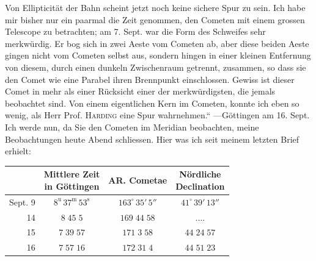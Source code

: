 \par\indent Von Ellipticität der Bahn scheint jetzt noch keine sichere Spur zu sein. Ich habe mir bisher nur ein paarmal die Zeit genommen, den Cometen mit einem grossen Telescope zu betrachten; am 7. Sept. war die Form des Schweifes sehr merkwürdig. Er bog sich in zwei Aeste vom Cometen ab, aber diese beiden Aeste gingen nicht vom Cometen selbst aus, sondern hingen in einer kleinen Entfernung von diesem, durch einen dunkeln Zwischenraum getrennt, zusammen, so dass sie den Comet wie eine Parabel ihren Brennpunkt einschlossen. Gewiss ist dieser Comet in mehr als einer Rücksicht einer der merkwürdigsten, die jemals beobachtet sind. Von einem eigentlichen Kern im Cometen, konnte ich eben so wenig, als Herr Prof. \textsc{Harding} eine Spur wahrnehmen.“ ---\quad Göttingen am 16. Sept. Ich werde nun, da Sie den Cometen im Meridian beobachten, meine Beobachtungen heute Abend schliessen. Hier was ich seit meinem letzten Brief erhielt:
\begin{center}\fontsize{10}{12}\selectfont\setlength{\tabcolsep}{4pt}\renewcommand{\arraystretch}{1.15}\begin{tabular}{r|c|c|c}
 & \shortstack{Mittlere Zeit\\in Göttingen} & AR. Cometae & \shortstack{Nördliche\\Declination}\\\hline
Sept. 9 & $8^{\mathrm u}\,37^{\mathrm m}\,53^{\mathrm s}$ & $163^\circ\,35'\,5''$ & $41^\circ\,39'\,13''$\\
14 & $8\;45\;5$ & $169\;44\;58$ & .\quad.\quad.\quad.\\
15 & $7\;39\;57$ & $171\;3\;58$ & $44\;24\;57$\\
16 & $7\;57\;16$ & $172\;31\;4$ & $44\;51\;23$\\
\end{tabular}\end{center}

